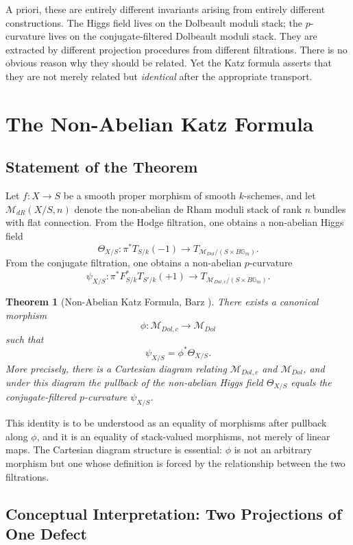\documentclass[12pt]{article}
\newtheorem{theorem}{Theorem}
\begin{document}
A priori, these are entirely different invariants arising from entirely different
constructions. The Higgs field lives on the Dolbeault moduli stack; the $p$-curvature
lives on the conjugate-filtered Dolbeault moduli stack. They are extracted by different
projection procedures from different filtrations. There is no obvious reason why they
should be related. Yet the Katz formula asserts that they are not merely related but
\emph{identical} after the appropriate transport.

\section{The Non-Abelian Katz Formula}

\subsection{Statement of the Theorem}

Let $f : X \to S$ be a smooth proper morphism of smooth $k$-schemes, and let
$\mathcal{M}_{dR}(X/S,n)$ denote the non-abelian de Rham moduli stack of rank $n$
bundles with flat connection. From the Hodge filtration, one obtains a non-abelian
Higgs field
\[
\Theta_{X/S} : \pi^* T_{S/k}(-1) \to T_{\mathcal{M}_{Dol}/(S \times B\mathbb{G}_m)}.
\]
From the conjugate filtration, one obtains a non-abelian $p$-curvature
\[
\psi_{X/S} : \pi^* F^*_{S/k}T_{S'/k}(+1) \to T_{\mathcal{M}_{Dol,c}/(S \times B\mathbb{G}_m)}.
\]

\begin{theorem}[Non-Abelian Katz Formula, Barz \cite{barz}]
There exists a canonical morphism
\[
\phi : \mathcal{M}_{Dol,c} \to \mathcal{M}_{Dol}
\]
such that
\[
\psi_{X/S} = \phi^*\Theta_{X/S}.
\]
More precisely, there is a Cartesian diagram relating $\mathcal{M}_{Dol,c}$ and
$\mathcal{M}_{Dol}$, and under this diagram the pullback of the non-abelian Higgs
field $\Theta_{X/S}$ equals the conjugate-filtered $p$-curvature $\psi_{X/S}$.
\end{theorem}

This identity is to be understood as an equality of morphisms after pullback along
$\phi$, and it is an equality of stack-valued morphisms, not merely of linear maps.
The Cartesian diagram structure is essential: $\phi$ is not an arbitrary morphism but
one whose definition is forced by the relationship between the two filtrations.

\subsection{Conceptual Interpretation: Two Projections of One Defect}
\end{document}
